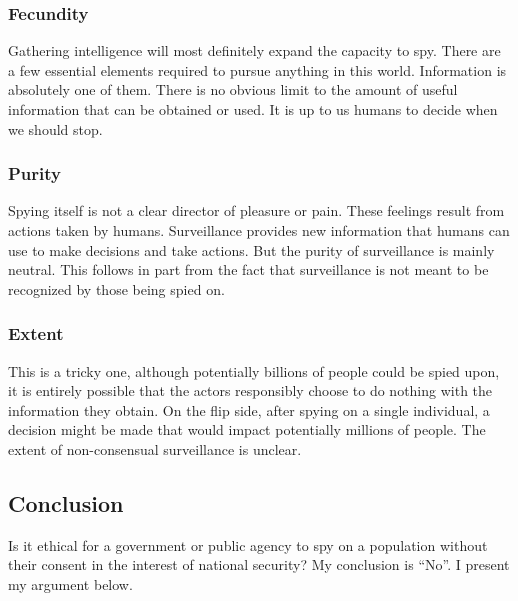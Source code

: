\documentclass[sigconf]{acmart}
\begin{document}
\subsubsection{Fecundity}
Gathering intelligence will most definitely expand the capacity to spy. There are a few essential elements required to pursue anything in this world. Information is absolutely one of them. There is no obvious limit to the amount of useful information that can be obtained or used. It is up to us humans to decide when we should stop.
\subsubsection{Purity}
Spying itself is not a clear director of pleasure or pain. These feelings result from actions taken by humans. Surveillance provides new information that humans can use to make decisions and take actions. But the purity of surveillance is mainly neutral. This follows in part from the fact that surveillance is not meant to be recognized by those being spied on.
\subsubsection{Extent}
This is a tricky one, although potentially billions of people could be spied upon, it is entirely possible that the actors responsibly choose to do nothing with the information they obtain. On the flip side, after spying on a single individual, a decision might be made that would impact potentially millions of people. The extent of non-consensual surveillance is unclear.
\subsection{Conclusion}
Is it ethical for a government or public agency to spy on a population without their consent in the interest of national security? My conclusion is “No”. I present my argument below.
\end{document}
